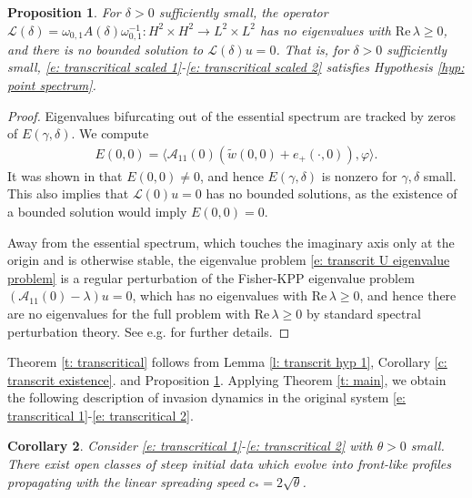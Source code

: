 \documentclass[11pt]{article}
\renewcommand{\phi}{\varphi}
\newcommand{\mcl}{\mathcal{L}}
\renewcommand{\Re}{\mathrm{Re} \,}
\newtheorem{prop}{Proposition}
\newtheorem{corollary}[prop]{Corollary}
\numberwithin{equation}{section}
\numberwithin{prop}{section}
\begin{document}
\begin{prop}\label{p: transcrit point spectrum}
	For $\delta > 0$ sufficiently small, the operator $\mcl(\delta) = \omega_{0,1}A(\delta) \omega_{0,1}^{-1} : H^2 \times H^2 \to L^2 \times L^2$ has no eigenvalues with $\Re \lambda \geq 0$, and there is no bounded solution to $\mcl(\delta) u = 0$. That is, for $\delta > 0$ sufficiently small, \eqref{e: transcritical scaled 1}-\eqref{e: transcritical scaled 2} satisfies Hypothesis \ref{hyp: point spectrum}. 
\end{prop}
\begin{proof}
	Eigenvalues bifurcating out of the essential spectrum are tracked by zeros of $E(\gamma, \delta)$. We compute
	\begin{align}
		E(0, 0) = \langle \mathcal{A}_{11}(0) (\tilde{w}(0,0) + e_+(\cdot, 0)), \phi \rangle. 
	\end{align}
	It was shown in \cite[proof of Lemma 4.6]{AveryGarenaux} that $E(0,0) \neq 0$, and hence $E(\gamma, \delta)$ is nonzero for $\gamma, \delta$ small. This also implies that $\mcl(0) u = 0$ has no bounded solutions, as the existence of a bounded solution would imply $E(0,0) = 0$. 
	
	Away from the essential spectrum, which touches the imaginary axis only at the origin and is otherwise stable, the eigenvalue problem \eqref{e: transcrit U eigenvalue problem} is a regular perturbation of the Fisher-KPP eigenvalue problem $(\mathcal{A}_{11}(0) - \lambda) u = 0$, which has no eigenvalues with $\Re \lambda \geq 0$, and hence there are no eigenvalues for the full problem with $\Re \lambda \geq 0$ by standard spectral perturbation theory. See e.g. \cite[proof of Theorem 2]{AveryGarenaux} for further details. 
\end{proof}

Theorem \ref{t: transcritical} follows from Lemma \ref{l: transcrit hyp 1}, Corollary \ref{c: transcrit existence}. and Proposition \ref{p: transcrit point spectrum}. Applying Theorem \ref{t: main}, we obtain the following description of invasion dynamics in the original system \eqref{e: transcritical 1}-\eqref{e: transcritical 2}.

\begin{corollary}\label{c: transcrit}
	Consider \eqref{e: transcritical 1}-\eqref{e: transcritical 2} with $\theta > 0$ small. There exist open classes of steep initial data which evolve into front-like profiles propagating with the linear spreading speed $c_* = 2 \sqrt{\theta}$. 
\end{corollary}
\end{document}

